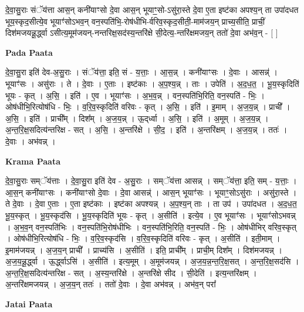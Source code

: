 \documentclass[17pt]{extarticle}
\begin{document}
दे॒वा॒सु॒राः संॅय॑त्ता आस॒न् कनी॑याꣳसो दे॒वा आस॒न् भूयाꣳ॒॒सो-ऽसु॑रा॒स्ते दे॒वा ए॒ता इष्ट॑का अपश्य॒न् ता उपा॑दधत भूय॒स्कृद॒सीत्ये॒व भूयाꣳ॑सोऽभव॒न् वन॒स्पति॑भि॒-रोष॑धीभि-र्वरिव॒स्कृद॒सीती॒-माम॑जय॒न् प्राच्य॒सीति॒ प्राचीं॒ दिश॑मजयन्नू॒र्द्ध्वा ऽसीत्य॒मूम॑जयन्-नन्तरिक्ष॒सद॑स्य॒न्तरि॑क्षे सी॒देत्य॒-न्तरि॑क्षमजय॒न् ततो॑ दे॒वा अभ॑व॒न् - [  ] \newline

\textbf{Pada Paata} \newline

दे॒वा॒सु॒रा इति॑ देव-अ॒सु॒राः । संॅय॑त्ता॒ इति॒ सं - य॒त्ताः॒ । आ॒स॒न्न् । कनी॑याꣳसः । दे॒वाः । आसन्न्॑ । भूयाꣳ॑सः । असु॑राः । ते । दे॒वाः । ए॒ताः । इष्ट॑काः । अ॒प॒श्य॒न्न् । ताः । उपेति॑ । अ॒द॒ध॒त॒ । भू॒य॒स्कृदिति॑ भूयः - कृत् । अ॒सि॒ । इति॑ । ए॒व । भूयाꣳ॑सः । अ॒भ॒व॒न्न् । वन॒स्पति॑भि॒रिति॒ वन॒स्पति॑ - भिः॒ । ओष॑धीभि॒रित्योष॑धि - भिः॒ । व॒रि॒व॒स्कृदिति॑ वरिवः - कृत् । अ॒सि॒ । इति॑ । इ॒माम् । अ॒ज॒य॒न्न् । प्राची᳚ । अ॒सि॒ । इति॑ । प्राची᳚म् । दिश᳚म् । अ॒ज॒य॒न्न् । ऊ॒द्‌र्ध्वा । अ॒सि॒ । इति॑ । अ॒मूम् । अ॒ज॒य॒न्न् । अ॒न्त॒रि॒क्ष॒सदित्य॑न्तरिक्ष - सत् । अ॒सि॒ । अ॒न्तरि॑क्षे । सी॒द॒ । इति॑ । अ॒न्तरि॑क्षम् । अ॒ज॒य॒न्न् । ततः॑ । दे॒वाः । अभ॑वन्न् ।  \newline


\textbf{Krama Paata} \newline

दे॒वा॒सु॒राः सम्ॅय॑त्ताः । दे॒वा॒सु॒रा इति॑ देव - अ॒सु॒राः । सम्ॅय॑त्ता आसन्न् । सम्ॅय॑त्ता॒ इति॒ सम् - य॒त्ताः॒ । आ॒स॒न् कनी॑याꣳसः । कनी॑याꣳसो दे॒वाः । दे॒वा आसन्न्॑ । आस॒न् भूयाꣳ॑सः । भूयाꣳ॒॒सोऽसु॑राः । असु॑रा॒स्ते । ते दे॒वाः । दे॒वा ए॒ताः । ए॒ता इष्ट॑काः । इष्ट॑का अपश्यन्न् । अ॒प॒श्य॒न् ताः । ता उप॑ । उपा॑दधत । अ॒द॒ध॒त॒ भू॒य॒स्कृत् । भू॒य॒स्कृद॑सि । भू॒य॒स्कृदिति॑ भूयः - कृत् । अ॒सीति॑ । इत्ये॒व । ए॒व भूयाꣳ॑सः । भूयाꣳ॑सोऽभवन्न् । अ॒भ॒व॒न् वन॒स्पति॑भिः । वन॒स्पति॑भि॒रोष॑धीभिः । वन॒स्पति॑भि॒रिति॒ वन॒स्पति॑ - भिः॒ । ओष॑धीभिर् वरिव॒स्कृत् । ओष॑धीभि॒रित्योष॑धि - भिः॒ । व॒रि॒व॒स्कृद॑सि । व॒रि॒व॒स्कृदिति॑ वरिवः - कृत् । अ॒सीति॑ । इती॒माम् । इ॒माम॑जयन्न् । अ॒ज॒य॒न् प्राची᳚ । प्राच्य॑सि । अ॒सीति॑ । इति॒ प्राची᳚म् । प्राची॒म् दिश᳚म् । दिश॑मजयन्न् । अ॒ज॒य॒न्नू॒र्द्ध्वा । ऊ॒र्द्ध्वाऽसि॑ । अ॒सीति॑ । इत्य॒मूम् । अ॒मूम॑जयन्न् । अ॒ज॒य॒न्न॒न्त॒रि॒क्ष॒सत् । अ॒न्त॒रि॒क्ष॒सद॑सि । अ॒न्त॒रि॒क्ष॒सदित्य॑न्तरिक्ष - सत् । अ॒स्य॒न्तरि॑क्षे । अ॒न्तरि॑क्षे सीद । सी॒देति॑ । इत्य॒न्तरि॑क्षम् । अ॒न्तरि॑क्षमजयन्न् । अ॒ज॒य॒न् ततः॑ । ततो॑ दे॒वाः । दे॒वा अभ॑वन्न् । अभ॑व॒न् परा᳚ \newline

\textbf{Jatai Paata} \newline
\end{document}
